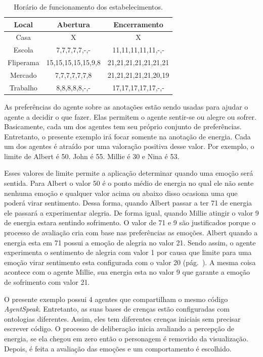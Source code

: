 \begin{table}[h]
	\caption{Horário de funcionamento dos estabelecimentos.}
	\label{tab:estaloca}
	\begin{center}
	\begin{tabular}{|c|c|c|}
		\hline
		Local & Abertura & Encerramento \\ \hline
		Casa & X & X \\ \hline
		Escola & 7,7,7,7,7,-,- & 11,11,11,11,11,-,- \\ \hline
		Fliperama & 15,15,15,15,15,9,8 & 21,21,21,21,21,21,21 \\ \hline
		Mercado & 7,7,7,7,7,7,8 & 21,21,21,21,21,20,19 \\ \hline
		Trabalho & 8,8,8,8,8,-,- & 17,17,17,17,17,-,- \\ \hline
	\end{tabular}
	\end{center}
\end{table}

As preferências do agente sobre as anotações estão sendo usadas para ajudar o
agente a decidir o que fazer. Elas permitem o agente sentir-se ou alegre ou
sofrer. Basicamente, cada um dos agentes tem seu próprio conjunto de
preferências. Entretanto, o presente exemplo irá focar somente na anotação de
energia. Cada um dos agentes é atraído por uma valoração positiva desse valor.
Por exemplo, o limite de Albert é 50. John é 55. Millie é 30 e Nina é 53.

Esses valores de limite permite a aplicação determinar quando uma emoção será
sentida. Para Albert o valor 50 é o ponto médio de energia no qual ele não
sente nenhuma emoção e qualquer valor acima ou abaixo disso ocasiona uma que
poderá virar sentimento. Dessa forma, quando Albert passar a ter 71 de energia
ele passará a experimentar alegria. De forma igual, quando Millie atingir o
valor 9 de energia estara sentindo sofrimento. O valor de 71 e 9 são
justificados porque o processo de avaliação cria com base nas preferências as
emoções. Albert quando a energia esta em 71 possui a emoção de alegria no
valor 21. Sendo assim, o agente experimenta o sentimento de alegria com valor
1 por causa que limite para uma emoção virar sentimento esta configurada com o
valor 20 (pág.~\pageref{mark:emo}). A mesma coisa acontece com o agente Millie,
sua energia esta no valor 9 que garante a emoção de sofrimento com valor 21.

O presente exemplo possui 4 agentes que compartilham o mesmo código
\emph{AgentSpeak}. Entretanto, as suas bases de crenças estão configuradas com
ontologias diferentes. Assim, eles tem diferentes crenças iniciais sem
precisar escrever código. O processo de deliberação inicia avaliando a
percepção de energia, se ela chegou em zero então o personagem é removido da
visualização. Depois, é feita a avaliação das emoções e um comportamento é
escolhido.

